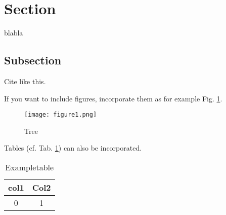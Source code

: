 
\section{Section}

blabla

\subsection{Subsection}
Cite like this\cite{succi}.

If you want to include figures, incorporate them as for example Fig. \ref{fig:lbm}.

\begin{figure}[h!]%
 	\begin{center}%
 		\texttt{[image: figure1.png]}%
 		\caption{Tree}\label{fig:lbm}%
 	\end{center}%
\end{figure}

Tables (cf. Tab. \ref{tab:example}) can also be incorporated.
\begin{table}[h]%
 	\begin{center}%
		\caption{Exampletable}\label{tab:example}%
	 	\begin{tabular}{c|c}%
 			col1 & Col2\\
 			\hline
 			0 & 1\\
 		\end{tabular}%
 	\end{center}%
\end{table}
